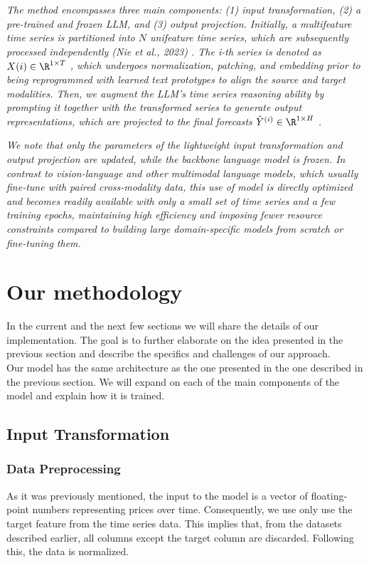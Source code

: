 \textit{The method encompasses three main components: (1) input transformation, (2) a pre-trained and frozen LLM, and (3) output projection. Initially, a multifeature time series is partitioned into \(N\) unifeature time series, which are subsequently processed independently (Nie et al., 2023) \cite{nie_et_al}.
	The i-th series is denoted as \(X(i) \in \R^{1\times T}\) , which undergoes normalization, patching, and embedding prior to being reprogrammed with learned text prototypes to align the source and target modalities.
	Then, we augment the LLM’s time series reasoning ability by prompting it together with the transformed series to generate output representations, which are projected to the final forecasts \(\hat{Y}^{(i)} \in \R^{1\times H}\) .}

\textit{We note that only the parameters of the lightweight input transformation and output projection are updated, while the backbone language model is frozen.
	In contrast to vision-language and other multimodal language models, which usually fine-tune with paired cross-modality data, this use of model is directly optimized and becomes readily available with only a small set of time series and a few  training epochs, maintaining high efficiency and imposing fewer resource constraints compared to building large domain-specific models from scratch or fine-tuning them.}

\section{Our methodology}
In the current and the next few sections we will share the details of our implementation. The goal is to further elaborate on the idea presented in the previous section and describe the specifics and challenges of our approach. \\

Our model has the same architecture as the one presented in the one described in the previous section. We will expand on each of the main components of the model and explain how it is trained.

\subsection{Input Transformation}

\subsubsection*{Data Preprocessing}
As it was previously mentioned, the input to the model is a vector of floating-point numbers representing prices over time. Consequently, we use only use the target feature from the time series data. This implies that, from the datasets described earlier, all columns except the target column are discarded. Following this, the data is normalized.

